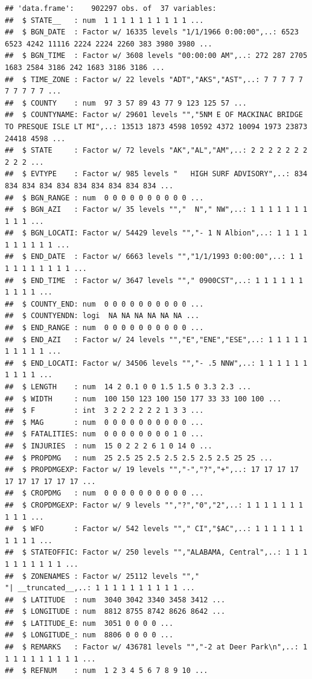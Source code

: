 \documentclass[]{article}
\begin{document}
\begin{verbatim}
## 'data.frame':    902297 obs. of  37 variables:
##  $ STATE__   : num  1 1 1 1 1 1 1 1 1 1 ...
##  $ BGN_DATE  : Factor w/ 16335 levels "1/1/1966 0:00:00",..: 6523 6523 4242 11116 2224 2224 2260 383 3980 3980 ...
##  $ BGN_TIME  : Factor w/ 3608 levels "00:00:00 AM",..: 272 287 2705 1683 2584 3186 242 1683 3186 3186 ...
##  $ TIME_ZONE : Factor w/ 22 levels "ADT","AKS","AST",..: 7 7 7 7 7 7 7 7 7 7 ...
##  $ COUNTY    : num  97 3 57 89 43 77 9 123 125 57 ...
##  $ COUNTYNAME: Factor w/ 29601 levels "","5NM E OF MACKINAC BRIDGE TO PRESQUE ISLE LT MI",..: 13513 1873 4598 10592 4372 10094 1973 23873 24418 4598 ...
##  $ STATE     : Factor w/ 72 levels "AK","AL","AM",..: 2 2 2 2 2 2 2 2 2 2 ...
##  $ EVTYPE    : Factor w/ 985 levels "   HIGH SURF ADVISORY",..: 834 834 834 834 834 834 834 834 834 834 ...
##  $ BGN_RANGE : num  0 0 0 0 0 0 0 0 0 0 ...
##  $ BGN_AZI   : Factor w/ 35 levels "","  N"," NW",..: 1 1 1 1 1 1 1 1 1 1 ...
##  $ BGN_LOCATI: Factor w/ 54429 levels "","- 1 N Albion",..: 1 1 1 1 1 1 1 1 1 1 ...
##  $ END_DATE  : Factor w/ 6663 levels "","1/1/1993 0:00:00",..: 1 1 1 1 1 1 1 1 1 1 ...
##  $ END_TIME  : Factor w/ 3647 levels ""," 0900CST",..: 1 1 1 1 1 1 1 1 1 1 ...
##  $ COUNTY_END: num  0 0 0 0 0 0 0 0 0 0 ...
##  $ COUNTYENDN: logi  NA NA NA NA NA NA ...
##  $ END_RANGE : num  0 0 0 0 0 0 0 0 0 0 ...
##  $ END_AZI   : Factor w/ 24 levels "","E","ENE","ESE",..: 1 1 1 1 1 1 1 1 1 1 ...
##  $ END_LOCATI: Factor w/ 34506 levels "","- .5 NNW",..: 1 1 1 1 1 1 1 1 1 1 ...
##  $ LENGTH    : num  14 2 0.1 0 0 1.5 1.5 0 3.3 2.3 ...
##  $ WIDTH     : num  100 150 123 100 150 177 33 33 100 100 ...
##  $ F         : int  3 2 2 2 2 2 2 1 3 3 ...
##  $ MAG       : num  0 0 0 0 0 0 0 0 0 0 ...
##  $ FATALITIES: num  0 0 0 0 0 0 0 0 1 0 ...
##  $ INJURIES  : num  15 0 2 2 2 6 1 0 14 0 ...
##  $ PROPDMG   : num  25 2.5 25 2.5 2.5 2.5 2.5 2.5 25 25 ...
##  $ PROPDMGEXP: Factor w/ 19 levels "","-","?","+",..: 17 17 17 17 17 17 17 17 17 17 ...
##  $ CROPDMG   : num  0 0 0 0 0 0 0 0 0 0 ...
##  $ CROPDMGEXP: Factor w/ 9 levels "","?","0","2",..: 1 1 1 1 1 1 1 1 1 1 ...
##  $ WFO       : Factor w/ 542 levels ""," CI","$AC",..: 1 1 1 1 1 1 1 1 1 1 ...
##  $ STATEOFFIC: Factor w/ 250 levels "","ALABAMA, Central",..: 1 1 1 1 1 1 1 1 1 1 ...
##  $ ZONENAMES : Factor w/ 25112 levels "","                                                                                                                               "| __truncated__,..: 1 1 1 1 1 1 1 1 1 1 ...
##  $ LATITUDE  : num  3040 3042 3340 3458 3412 ...
##  $ LONGITUDE : num  8812 8755 8742 8626 8642 ...
##  $ LATITUDE_E: num  3051 0 0 0 0 ...
##  $ LONGITUDE_: num  8806 0 0 0 0 ...
##  $ REMARKS   : Factor w/ 436781 levels "","-2 at Deer Park\n",..: 1 1 1 1 1 1 1 1 1 1 ...
##  $ REFNUM    : num  1 2 3 4 5 6 7 8 9 10 ...
\end{verbatim}
\end{document}
